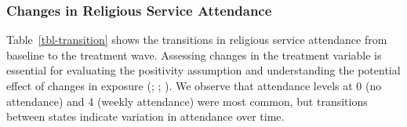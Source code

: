 \documentclass[
  single column]{article}
\begin{document}
\newpage{}

\subsubsection{Changes in Religious Service
Attendance}\label{changes-in-religious-service-attendance}

Table~\ref{tbl-transition} shows the transitions in religious service
attendance from baseline to the treatment wave. Assessing changes in the
treatment variable is essential for evaluating the positivity assumption
and understanding the potential effect of changes in exposure
(;
;
). We
observe that attendance levels at 0 (no attendance) and 4 (weekly
attendance) were most common, but transitions between states indicate
variation in attendance over time.
\end{document}
